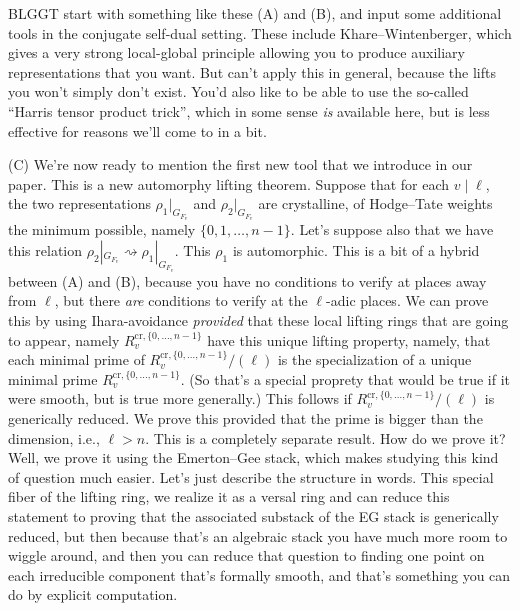 \documentclass[reqno]{amsart} 
\begin{document}
BLGGT start with something like these (A) and (B), and input some additional tools in the 
conjugate self-dual setting.  These include Khare--Wintenberger, which gives a very strong local-global principle allowing you to produce auxiliary representations that you want.  But can't apply this in general, because the lifts you won't simply don't exist.  You'd also like to be able to use the so-called ``Harris tensor product trick'', which in some sense \emph{is} available here, but is less effective for reasons we'll come to in a bit.

(C) We're now ready to mention the first new tool that we introduce in our paper.  This is a new automorphy lifting theorem.  Suppose that for each $v \mid \ell$, the two representations $\rho_1 |_{G_{F_v}}$ and $\rho_2 |_{G_{F_v}}$ are crystalline, of Hodge--Tate weights the minimum possible, namely $\{0, 1, \dotsc, n - 1\}$.  Let's suppose also that we have this relation $\rho_2 |_{G_{F_v}} \rightsquigarrow \rho_1 |_{G_{F_v}}$.  This $\rho_1$ is automorphic.  This is a bit of a hybrid between (A) and (B), because you have no conditions to verify at places away from $\ell$, but there \emph{are} conditions to verify at the $\ell$-adic places.  We can prove this by using Ihara-avoidance \emph{provided} that these local lifting rings that are going to appear, namely $R_v^{\mathrm{cr}, \{0, \dotsc, n - 1\}}$ have this unique lifting property, namely, that each minimal prime of $R_v^{\mathrm{cr}, \{0, \dotsc, n - 1\}} / (\ell)$ is the specialization of a unique minimal prime $R_v^{\mathrm{cr}, \{0, \dotsc, n - 1\}}$.  (So that's a special proprety that would be true if it were smooth, but is true more generally.)  This follows if $R_v^{\mathrm{cr}, \{0, \dotsc, n - 1\}} / (\ell)$ is generically reduced.  We prove this provided that the prime is bigger than the dimension, i.e., $\ell > n$.  This is a completely separate result.  How do we prove it?  Well, we prove it using the Emerton--Gee stack, which makes studying this kind of question much easier.  Let's just describe the structure in words.  This special fiber of the lifting ring, we realize it as a versal ring and can reduce this statement to proving that the associated substack of the EG stack is generically reduced, but then because that's an algebraic stack you have much more room to wiggle around, and then you can reduce that question to finding one point on each irreducible component that's formally smooth, and that's something you can do by explicit computation.
\end{document}
